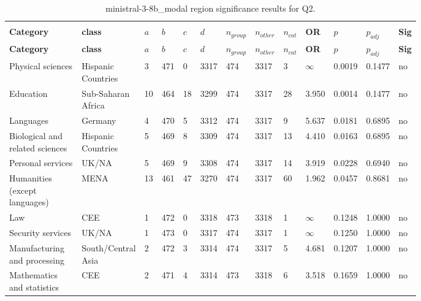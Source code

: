 \begin{longtable}{p{0.18\linewidth}p{0.11\linewidth}p{0.035\linewidth}p{0.035\linewidth}p{0.035\linewidth}p{0.035\linewidth}p{0.045\linewidth}p{0.045\linewidth}p{0.045\linewidth}p{0.06\linewidth}p{0.055\linewidth}p{0.055\linewidth}p{0.04\linewidth}}
\caption{ministral-3-8b_modal region significance results for Q2.}\\
\label{tab:appendix-q2-ministral-3-8b_modal-region}\\
\scriptsize
\setlength{\tabcolsep}{2pt}
\toprule
\textbf{Category} & \textbf{class} & \textbf{$a$} & \textbf{$b$} & \textbf{$c$} & \textbf{$d$} & \textbf{$n_{group}$} & \textbf{$n_{other}$} & \textbf{$n_{cat}$} & \textbf{OR} & \textbf{$p$} & \textbf{$p_{adj}$} & \textbf{Sig} \\
\midrule
\endfirsthead
\toprule
\textbf{Category} & \textbf{class} & \textbf{$a$} & \textbf{$b$} & \textbf{$c$} & \textbf{$d$} & \textbf{$n_{group}$} & \textbf{$n_{other}$} & \textbf{$n_{cat}$} & \textbf{OR} & \textbf{$p$} & \textbf{$p_{adj}$} & \textbf{Sig} \\
\midrule
\endhead
\midrule
\endfoot
\bottomrule
\endlastfoot
Physical sciences & Hispanic Countries & 3 & 471 & 0 & 3317 & 474 & 3317 & 3 & $\infty$ & 0.0019 & 0.1477 & no \\
Education & Sub-Saharan Africa & 10 & 464 & 18 & 3299 & 474 & 3317 & 28 & 3.950 & 0.0014 & 0.1477 & no \\
Languages & Germany & 4 & 470 & 5 & 3312 & 474 & 3317 & 9 & 5.637 & 0.0181 & 0.6895 & no \\
Biological and related sciences & Hispanic Countries & 5 & 469 & 8 & 3309 & 474 & 3317 & 13 & 4.410 & 0.0163 & 0.6895 & no \\
Personal services & UK/NA & 5 & 469 & 9 & 3308 & 474 & 3317 & 14 & 3.919 & 0.0228 & 0.6940 & no \\
Humanities (except languages) & MENA & 13 & 461 & 47 & 3270 & 474 & 3317 & 60 & 1.962 & 0.0457 & 0.8681 & no \\
Law & CEE & 1 & 472 & 0 & 3318 & 473 & 3318 & 1 & $\infty$ & 0.1248 & 1.0000 & no \\
Security services & UK/NA & 1 & 473 & 0 & 3317 & 474 & 3317 & 1 & $\infty$ & 0.1250 & 1.0000 & no \\
Manufacturing and processing & South/Central Asia & 2 & 472 & 3 & 3314 & 474 & 3317 & 5 & 4.681 & 0.1207 & 1.0000 & no \\
Mathematics and statistics & CEE & 2 & 471 & 4 & 3314 & 473 & 3318 & 6 & 3.518 & 0.1659 & 1.0000 & no \\

\end{longtable}
